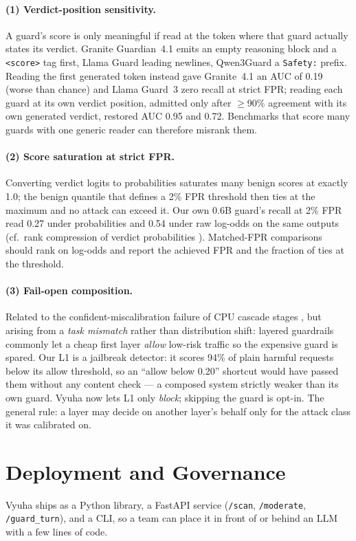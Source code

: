 \documentclass[11pt]{article}
\begin{document}
\paragraph{(1) Verdict-position sensitivity.} A guard's score is only meaningful if read at the token
where that guard actually states its verdict. Granite Guardian~4.1 emits an empty reasoning block and a
\texttt{<score>} tag first, Llama Guard leading newlines, Qwen3Guard a \texttt{Safety:} prefix. Reading
the first generated token instead gave Granite~4.1 an AUC of 0.19 (worse than chance) and Llama Guard~3
zero recall at strict FPR; reading each guard at its own verdict position, admitted only after $\geq$90\%
agreement with its own generated verdict, restored AUC 0.95 and 0.72. Benchmarks that score many guards
with one generic reader can therefore misrank them.

\paragraph{(2) Score saturation at strict FPR.} Converting verdict logits to probabilities saturates
many benign scores at exactly 1.0; the benign quantile that defines a 2\% FPR threshold then ties at the
maximum and no attack can exceed it. Our own 0.6B guard's recall at 2\% FPR read 0.27 under probabilities
and 0.54 under raw log-odds on the same outputs (cf.\ rank compression of verdict probabilities
\citep{rank-compression}). Matched-FPR comparisons should rank on log-odds and
report the achieved FPR and the fraction of ties at the threshold.

\paragraph{(3) Fail-open composition.} Related to the confident-miscalibration failure of CPU cascade
stages \citep{guardchain}, but arising from a \emph{task mismatch} rather than distribution shift: layered
guardrails commonly let a cheap first layer \emph{allow}
low-risk traffic so the expensive guard is spared. Our L1 is a jailbreak detector: it scores 94\% of
plain harmful requests below its allow threshold, so an ``allow below 0.20'' shortcut would have passed
them without any content check --- a composed system strictly weaker than its own guard. Vyuha now lets
L1 only \emph{block}; skipping the guard is opt-in. The general rule: a layer may decide on another
layer's behalf only for the attack class it was calibrated on.

\section{Deployment and Governance}
Vyuha ships as a Python library, a FastAPI service (\texttt{/scan}, \texttt{/moderate},
\texttt{/guard\_turn}), and a CLI, so a team can place it in front of or behind an LLM with a few
lines of code.
\end{document}
